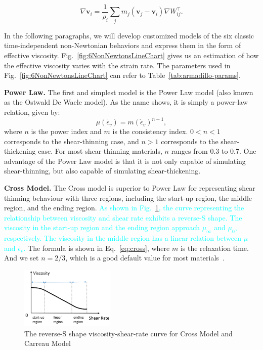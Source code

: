 \documentclass[10pt,journal,compsoc]{IEEEtran}
\newcommand{\revised}[1]{{\textcolor{cyan}{#1}}}
\begin{document}
\begin{equation}
	\nabla \mathbf{v}_i=\frac{1}{\rho_i} \sum_j m_j\left(\mathbf{v}_j-\mathbf{v}_i\right) \nabla W_{i j}^{\top}. \label{eq:velGradient}
\end{equation}

In the following paragraphs, we will develop customized models of the six classic time-independent non-Newtonian behaviors and express them in the form of effective viscosity. Fig.~\ref{fig:6NonNewtonsLineChart} gives us an estimation of how the effective viscosity varies with the strain rate. The parameters used in Fig.~\ref{fig:6NonNewtonsLineChart} can refer to Table~\ref{tab:armadillo-params}.

\textbf{Power Law.}
The first and simplest model is the Power Law model (also known as the Ostwald De Waele model). As the name shows, it is simply a power-law relation, given by:
\begin{equation}
	\mu(\dot{\epsilon_v}) = m (\dot\epsilon_v)^{n-1} \label{eq:powerLaw},
\end{equation}
where $n$ is the power index and $m$ is the consistency index. $0<n<1$ corresponds to the shear-thinning case, and $n>1$ corresponds to the shear-thickening case. For most shear-thinning materials, $n$ ranges from 0.3 to 0.7. One advantage of the Power Law model is that it is not only capable of simulating shear-thinning, but also capable of simulating shear-thickening.

\textbf{Cross Model.}
The Cross model is superior to Power Law for representing shear thinning behaviour with three regions, including the start-up region, the middle region, and the ending region. \revised{As shown in Fig.~\ref{fig:reverse-S}, the curve representing the relationship between viscosity and shear rate exhibits a reverse-S shape. The viscosity in the start-up region and the ending region approach $\mu_{\infty}$ and $\mu_0$, respectively. The viscosity in the middle region has a linear relation between $\mu$ and $\dot{\epsilon_v}$.} The formula is shown in Eq.~\ref{eq:cross}, where $m$ is the relaxation time. And we set $n=2/3$, which is a good default value for most materials~\cite{Cross1965}.

\begin{figure}[htbp]
	\centering
	\includegraphics[width=0.4\textwidth]{pics/reverse-S.png}
	\caption{The reverse-S shape viscosity-shear-rate curve for Cross Model and Carreau Model}     \label{fig:reverse-S}
\end{figure}
\end{document}
